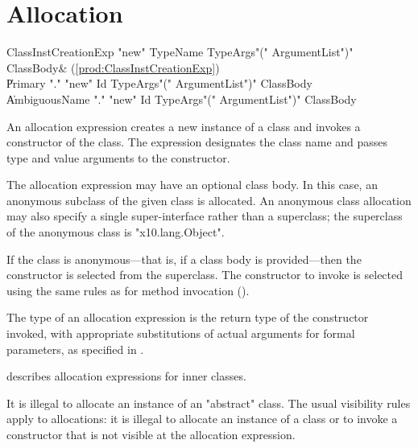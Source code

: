 \section{Allocation}
\label{ClassCreation}

\begin{bbgrammar}
ClassInstCreationExp \: \xcd"new" TypeName TypeArgs\opt \xcd"(" ArgumentList\opt \xcd")" ClassBody\opt & (\ref{prod:ClassInstCreationExp}) \\
                     \| Primary \xcd"." \xcd"new" Id TypeArgs\opt \xcd"(" ArgumentList\opt \xcd")" ClassBody\opt \\
                     \| AmbiguousName \xcd"." \xcd"new" Id TypeArgs\opt \xcd"(" ArgumentList\opt \xcd")" ClassBody\opt \\
\end{bbgrammar}

An allocation expression creates a new instance of a class and
invokes a constructor of the class.
The expression designates the class name and passes
type and value arguments to the constructor.

The allocation expression may have an optional class body.
In this case, an anonymous subclass of the given class is
allocated.   An anonymous class allocation may also specify a
single super-interface rather than a superclass; the superclass
of the anonymous class is \xcd"x10.lang.Object".

If the class is anonymous---that is, if a class body is
provided---then the constructor is selected from the superclass.
The constructor to invoke is selected using the same rules as
for method invocation ().

The type of an allocation expression
is the return type of the constructor invoked, with appropriate
substitutions  of actual arguments for formal parameters, as
specified in .

 describes allocation expressions for inner classes. 

It is illegal to allocate an instance of an \xcd"abstract" class.
The usual visibility rules apply to allocations: 
it is illegal to allocate an instance of a class or to invoke a
constructor that is not visible at
the allocation expression.

